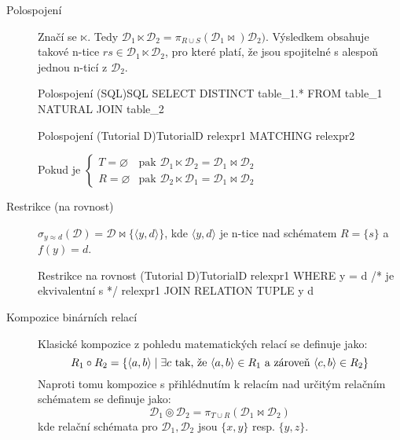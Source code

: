 \begin{description}
\item[Polospojení] Značí se $\ltimes$. Tedy $\mathcal{D}_{1} \ltimes \mathcal{D}_{2} = \pi_{R \cup S} (\mathcal{D}_{1} \Join) \mathcal{D}_{2})$. Výsledkem obsahuje takové n-tice $rs \in \mathcal{D}_{1} \ltimes \mathcal{D}_{2}$, pro které platí, že jsou spojitelné s alespoň jednou n-ticí z $\mathcal{D}_{2}$.
\begin{upcode}{Polospojení (SQL)}{}{SQL}
SELECT DISTINCT table_1.* FROM table_1 NATURAL JOIN table_2
\end{upcode}
\begin{upcode}{Polospojení (Tutorial D)}{}{TutorialD}
relexpr1 MATCHING relexpr2
\end{upcode}
Pokud je $\left\{\!\!\!
\begin{array}{ll}
T = \varnothing & \text{pak } \mathcal{D}_{1} \ltimes \mathcal{D}_{2} = \mathcal{D}_{1} \Join \mathcal{D}_{2} \\
R = \varnothing & \text{pak } \mathcal{D}_{2} \ltimes \mathcal{D}_{1} = \mathcal{D}_{1} \Join \mathcal{D}_{2}
\end{array}\right.$

\item[Restrikce (na rovnost)] $\sigma_{y \approx d} (\mathcal{D}) = \mathcal{D} \Join \lbrace \langle y, d \rangle \rbrace $, kde $\langle y, d \rangle$ je n-tice nad schématem $R = \lbrace s \rbrace$ a $f(y) = d$.
\begin{upcode}{Restrikce na rovnost (Tutorial D)}{}{TutorialD}
relexpr1 WHERE y = d
/* je ekvivalentní s */
relexpr1 JOIN RELATION {TUPLE {y d}}
\end{upcode}

\item[Kompozice binárních relací] Klasické kompozice z pohledu matematických relací se definuje jako:
$$
R_{1} \circ R_{2} = \lbrace \langle a, b \rangle \thickspace | \thickspace \exists c \text{ tak, že } \langle a, b \rangle \in R_{1} \text{ a zároveň } \langle c, b \rangle \in R_{2} \rbrace
$$
Naproti tomu kompozice s přihlédnutím k relacím nad určitým relačním schématem se definuje jako:
$$
\mathcal{D}_{1} \circledcirc \mathcal{D}_{2} = \pi_{T \cup R} (\mathcal{D}_{1} \Join \mathcal{D}_{2})
$$
kde relační schémata pro $\mathcal{D}_{1}, \mathcal{D}_{2}$ jsou $\lbrace x, y \rbrace$ resp. $\lbrace y, z \rbrace$.

\end{description}
